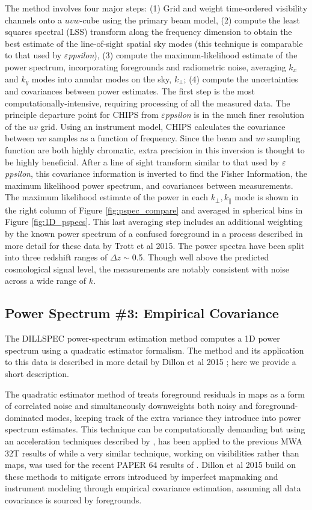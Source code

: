 \documentclass[preprint2]{aastex}
\def\eppsilon{{\it $\varepsilon$ppsilon}}
\def\empirical{DILLSPEC}
\def\chipscite{Trott et al 2015}
\def\dilloncite{Dillon et al 2015 }
\begin{document}
The method involves four major steps: (1) Grid and weight time-ordered visibility channels onto a $uvw$-cube using the primary beam model, (2) compute the least squares spectral (LSS) transform along the frequency dimension to obtain the best estimate of the line-of-sight spatial sky modes (this technique is comparable to that used by \eppsilon), (3) compute the maximum-likelihood estimate of the power spectrum, incorporating foregrounds and radiometric noise,  averaging $k_x$ and $k_y$ modes into annular modes on the sky, $k_\bot$; (4) compute the uncertainties and covariances between power estimates. The first step is the most computationally-intensive, requiring processing of all the measured data. The principle departure point for CHIPS from \eppsilon{} is in the much finer resolution of the $uv$ grid.  Using an instrument model, CHIPS calculates the covariance between $uv$ samples as a function of frequency.  Since the beam and $uv$ sampling function are both highly chromatic, extra precision in this inversion is thought to be highly beneficial. After a line of sight transform similar to that used by \eppsilon{}, this covariance information is inverted to find the Fisher Information, the maximum likelihood power spectrum, and covariances between measurements.  The maximum likelihood estimate of the power in each $k_\bot,k_\parallel$ mode is shown in the right column of Figure \ref{fig:pspec_compare} and averaged in spherical bins in Figure \ref{fig:1D_pspecs}. This last averaging step includes an additional weighting by the known power spectrum of a confused foreground in a process described in more detail for these data by \chipscite{}. The power spectra have been split into three redshift ranges of $\Delta z\sim$0.5. Though well above the predicted cosmological signal level, the measurements are notably consistent with noise across a wide range of $k$. 

\subsection{Power Spectrum \#3: Empirical Covariance}
\label{sec:empirical_cov}

The \empirical{} power-spectrum estimation method computes a 1D power spectrum using a quadratic estimator formalism. The method and its application to this data is described in more detail by \dilloncite{}; here we provide a short description.

The quadratic estimator method of \cite{Liu:2011p8763} treats foreground residuals in maps as a form of correlated noise and simultaneously downweights both noisy and foreground-dominated modes, keeping track of the extra variance they introduce into power spectrum estimates. This technique can be computationally demanding but using an acceleration techniques described by \cite{Dillon:2013p10497}, has been applied to the previous MWA 32T results of \cite{Dillon:2014p9788} while a very similar technique, working on visibilities rather than maps, was used for the recent PAPER 64 results of \cite{2015arXiv150206016A}.  \dilloncite{} build on these methods to mitigate errors introduced by imperfect mapmaking and instrument modeling through empirical covariance estimation, assuming all data covariance is sourced by foregrounds.
\end{document}
